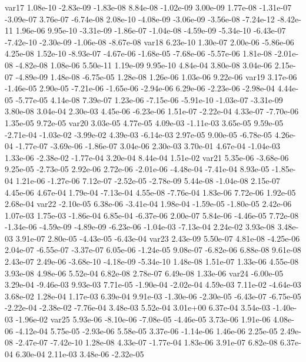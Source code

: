 var17  1.08e-10 -2.83e-09 -1.83e-08  8.84e-08 -1.02e-09  3.00e-09  1.77e-08 -1.31e-07 -3.09e-07  3.76e-07 -6.74e-08  2.08e-10 -4.08e-09 -3.06e-09 -3.56e-08 -7.24e-12 -8.42e-11  1.96e-06  9.95e-10 -3.31e-09 -1.86e-07 -1.04e-08 -4.59e-09 -5.34e-10 -6.43e-07 -7.42e-10 -2.30e-09 -1.06e-08 -8.67e-08
var18  6.23e-10  1.30e-07  2.00e-06 -5.86e-06  4.25e-08  1.52e-10 -8.93e-07 -4.67e-06 -1.68e-05 -7.68e-06 -5.57e-06  1.81e-08 -2.01e-08 -4.82e-08  1.08e-06  5.50e-11  1.19e-09  9.95e-10  4.84e-04  3.80e-08  3.04e-06  2.15e-07 -4.89e-09  1.48e-08 -6.75e-05  1.28e-08  1.26e-06  1.03e-06  9.22e-06
var19  3.17e-06 -1.46e-05  2.90e-05 -7.21e-06 -1.65e-06 -2.94e-06  6.29e-06 -2.23e-06 -2.98e-04  4.44e-05 -5.77e-05  4.14e-08  7.39e-07  1.23e-06 -7.15e-06 -5.91e-10 -1.03e-07 -3.31e-09  3.80e-08  3.04e-04  2.30e-03  4.45e-06 -6.23e-06  1.51e-07 -2.22e-04  4.33e-07 -7.70e-06  1.35e-05  9.72e-05
var20  3.03e-05  4.77e-05  4.09e-03 -1.11e-03  3.65e-05  9.59e-05 -2.71e-04 -1.03e-02 -3.99e-02  4.39e-03 -6.14e-03  2.97e-05  9.00e-05 -6.78e-05  4.26e-04 -1.77e-07 -3.69e-06 -1.86e-07  3.04e-06  2.30e-03  3.70e-01  4.67e-04 -1.04e-03  1.33e-06 -2.38e-02 -1.77e-04  3.20e-04  8.44e-04  1.51e-02
var21  5.35e-06 -3.68e-06  9.25e-05 -2.73e-05  2.92e-06  2.72e-06 -2.01e-06 -4.48e-04 -7.41e-04  8.93e-05 -1.85e-04  1.21e-06 -1.27e-06  7.12e-07 -2.52e-05 -2.78e-09  5.44e-08 -1.04e-08  2.15e-07  4.45e-06  4.67e-04  1.79e-04 -7.13e-04  4.55e-08 -7.76e-04  1.83e-06  7.72e-06  1.92e-05  2.68e-04
var22 -2.10e-05  6.38e-06 -3.41e-04  1.98e-04 -1.59e-05 -1.80e-05  2.42e-06  1.07e-03  1.75e-03 -1.86e-04  6.85e-04 -6.37e-06  2.00e-07  5.84e-06 -4.46e-05  7.72e-08 -1.34e-06 -4.59e-09 -4.89e-09 -6.23e-06 -1.04e-03 -7.13e-04  2.24e-02  3.93e-08  3.48e-03  3.91e-07  2.80e-05 -4.43e-05 -6.43e-04
var23  2.43e-09  5.50e-07  4.81e-08 -4.25e-06  2.04e-07 -6.55e-07 -3.37e-07  6.05e-06 -1.24e-05  9.08e-07 -6.82e-06  6.88e-08  9.61e-08  2.43e-07  2.49e-06 -3.68e-10 -4.18e-09 -5.34e-10  1.48e-08  1.51e-07  1.33e-06  4.55e-08  3.93e-08  4.98e-06  5.52e-04  6.82e-08  2.78e-07  6.49e-08  1.33e-06
var24 -6.00e-05  3.29e-04 -9.46e-03  9.93e-03  7.71e-05 -1.90e-04 -2.02e-04  4.59e-03  7.11e-02 -4.64e-03  3.68e-02  1.28e-04  1.17e-03  6.39e-04  9.91e-03 -1.30e-06 -2.30e-05 -6.43e-07 -6.75e-05 -2.22e-04 -2.38e-02 -7.76e-04  3.48e-03  5.52e-04  3.01e+00  6.37e-04  3.54e-03 -1.40e-03 -1.96e-02
var25  5.93e-06 -8.10e-06 -7.08e-05 -4.46e-05  3.73e-06  1.91e-06  4.08e-06 -4.12e-04  5.75e-05 -2.93e-06  5.58e-05  3.37e-06 -1.14e-06  1.46e-06  2.25e-05  2.49e-08 -2.47e-07 -7.42e-10  1.28e-08  4.33e-07 -1.77e-04  1.83e-06  3.91e-07  6.82e-08  6.37e-04  6.30e-04  2.11e-03  3.48e-06 -2.32e-05
